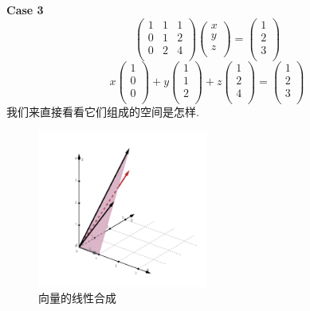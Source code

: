 \documentclass[UTF8]{book}
\begin{document}
\noindent \textbf{Case 3}
\begin{equation}
    \begin{pmatrix}
        1 & 1 & 1 \\
        0 & 1 & 2 \\
        0 & 2 & 4 \\
    \end{pmatrix}
    \begin{pmatrix}
        x \\
        y \\
        z \\
    \end{pmatrix}
    =
    \begin{pmatrix}
        1 \\
        2 \\
        3 \\
    \end{pmatrix}
    \end{equation}
    \begin{equation}
        x
        \begin{pmatrix}
            1 \\
            0 \\
            0 \\
        \end{pmatrix}
        +
        y
        \begin{pmatrix}
            1 \\
            1 \\
            2 \\
        \end{pmatrix}
        +
        z
        \begin{pmatrix}
            1 \\
            2 \\
            4 \\
        \end{pmatrix}
        =
        \begin{pmatrix}
            1 \\
            2 \\
            3 \\
        \end{pmatrix}
    \end{equation}
    我们来直接看看它们组成的空间是怎样.

    \begin{figure}[h]
        \centering
        \includegraphics[width = 0.5\textwidth]{linear equation 3.png}
        \caption{向量的线性合成}
        \label{fig. linear equation 3}
    \end{figure}
    
\end{document}
